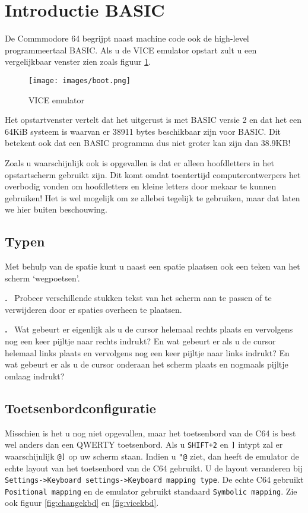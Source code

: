 \documentclass{article}
\newcounter{problem}
\newcounter{solution}
\newcommand\problem{%
  \stepcounter{problem}%
  \textbf{\theproblem.}~%
  \setcounter{solution}{0}%
}
\begin{document}
\section{Introductie BASIC}

De Commmodore 64 begrijpt naast machine code ook de high-level programmeertaal BASIC.
Als u de VICE emulator opstart zult u een vergelijkbaar venster zien zoals figuur \ref{fig:vice}.

\begin{figure}
\centering
\texttt{[image: images/boot.png]}
\caption{VICE emulator}
\label{fig:vice}
\end{figure}

Het opstartvenster vertelt dat het uitgerust is met BASIC versie 2 en dat het een 64KiB systeem is waarvan er 38911 bytes beschikbaar zijn voor BASIC.
Dit betekent ook dat een BASIC programma dus niet groter kan zijn dan 38.9KB!

Zoals u waarschijnlijk ook is opgevallen is dat er alleen hoofdletters in het opstartscherm gebruikt zijn.
Dit komt omdat toentertijd computerontwerpers het overbodig vonden om hoofdletters en kleine letters door mekaar te kunnen gebruiken!
Het is wel mogelijk om ze allebei tegelijk te gebruiken, maar dat laten we hier buiten beschouwing.

\subsection{Typen}

Met behulp van de spatie kunt u naast een spatie plaatsen ook een teken van het scherm `wegpoetsen'.

\problem Probeer verschillende stukken tekst van het scherm aan te passen of te verwijderen door er spaties overheen te plaatsen.

\problem Wat gebeurt er eigenlijk als u de cursor helemaal rechts plaats en vervolgens nog een keer pijltje naar rechts indrukt?
En wat gebeurt er als u de cursor helemaal links plaats en vervolgens nog een keer pijltje naar links indrukt?
En wat gebeurt er als u de cursor onderaan het scherm plaats en nogmaals pijltje omlaag indrukt?

\subsection{Toetsenbordconfiguratie}

Misschien is het u nog niet opgevallen, maar het toetsenbord van de C64 is best wel anders dan een QWERTY toetsenbord.
Als u \verb:SHIFT+2: en \verb:]: intypt zal er waarschijnlijk \verb:@]: op uw scherm staan.
Indien u \verb:"@: ziet, dan heeft de emulator de echte layout van het toetsenbord van de C64 gebruikt.
U de layout veranderen bij \verb:Settings->Keyboard settings->Keyboard mapping type:.
De echte C64 gebruikt \verb:Positional mapping: en de emulator gebruikt standaard \verb:Symbolic mapping:.
Zie ook figuur \ref{fig:changekbd} en \ref{fig:vicekbd}.
\end{document}
